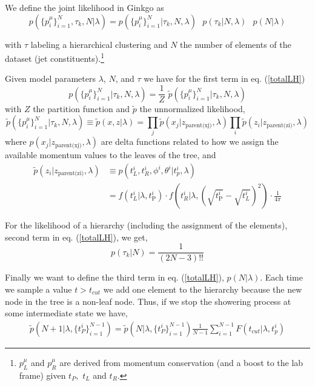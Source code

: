 \documentclass[12pt]{article}
\begin{document}
We define the joint likelihood in Ginkgo as 
\begin{equation}\label{totalLH}
    p(\{p_i^\mu\}_{i=1}^N, \tau_k, N | \lambda) =  p(\{p_i^\mu\}_{i=1}^N| \tau_k , N, \lambda) \,\,\,\,p( \tau_k |N,\lambda)\,\,\,\ p(N |\lambda)
\end{equation}

with $\tau$ labeling a hierarchical clustering and $N$ the number of elements of the dataset (jet constituents).\footnote{ $p^\mu_L$ and $p^\mu_R$ are derived from momentum conservation (and a boost to the lab frame) given $t_P,\,\,t_L$ and $t_R$.} 

Given model parameters $\lambda$, $N$, and $\tau$ we have for the first term in eq. (\ref{totalLH})
\begin{equation}
 p(\{p_i^\mu\}_{i=1}^N| \tau_k , N, \lambda) = \frac{1}{Z}\,\, \tilde{p}(\{p_i^\mu\}_{i=1}^N| \tau_k , N, \lambda)
\end{equation}
with $Z$ the partition function and $\tilde{p}$ the unnormalized likelihood,
\begin{equation}
\tilde{p}(\{p_i^\mu\}_{i=1}^N| \tau_k , N, \lambda) \equiv \tilde{p}(x,z| \lambda) = \prod_j \tilde{p}(x_j|z_{\text{parent(xj)}},\lambda) \prod_i \tilde{p}(z_i| z_{\text{parent(zi)}}, \lambda)
\end{equation}
where $p(x_j|z_{\text{parent(xj)}},\lambda)$ are delta functions related to how we assign the available momentum values to the leaves of the tree, and 
\begin{align}
    \tilde{p}(z_i| z_{\text{parent(zi)}}, \lambda) & \equiv p(t_L^i,t_R^i,\phi^i,\theta^i|t_p^i,\lambda) \nonumber \\ &=
    f(t_L^i | \lambda, t_{\text{P}}^i) \cdot f(t_R^i | \lambda, (\sqrt{t_{\text{P}}^i}-\sqrt{t_L^i})^2) \cdot \frac{1}{4 \pi}
\end{align}

For the likelihood of a hierarchy (including the assignment of the elements), second term in eq. (\ref{totalLH}), we get,
\begin{equation}
 p( \tau_k | N ) = \frac{1}{(2N-3)!!} 
\end{equation}

Finally we want to define the third term in eq. (\ref{totalLH}), $p(N |\lambda)$. Each time we sample a value $t > t_{cut}$ we add one element to the hierarchy because the new node in the tree is a non-leaf node. Thus, if we stop the showering process at some intermediate state we have,
\begin{eqnarray}
\tilde{p} (N+1 | \lambda, \{t_P^i\}_{i=1}^{N-1}) = \tilde{p} (N | \lambda, \{t_P^i\}_{i=1}^{N-1}) \frac{1}{N-1} \sum_{i=1}^{N-1} F(t_{cut} | \lambda, t_p^i)
\end{eqnarray}
\end{document}
